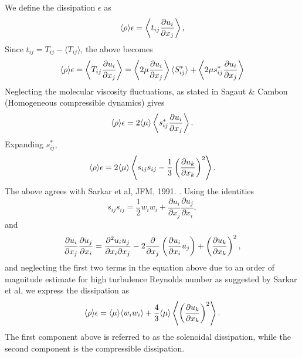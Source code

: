 \documentclass[oneside,a4paper,11pt]{report}
\begin{document}
We define the dissipation $\epsilon$ as
\begin{equation}
\langle \rho \rangle \epsilon = \left <  t_{ij} \frac{ \partial u_i }{\partial x_j } \right > ,
\end{equation}
Since $t_{ij} = T_{ij} - \langle T_{ij} \rangle$, the above becomes
\begin{equation}
    \langle \rho \rangle \epsilon = \left < T_{ij} \frac{\partial u_i}{\partial x_j} \right > = \left < 2 \mu \frac{\partial u_i}{\partial x_j} \right > \langle S^*_{ij} \rangle + \left < 2 \mu s^*_{ij} \frac{\partial u_i}{\partial x_j} \right >
\end{equation}
Neglecting the molecular viscosity fluctuations, as stated in Sagaut \& Cambon (Homogeneous compressible dynamics) gives
\begin{equation}
    \langle \rho \rangle \epsilon = 2 \langle \mu \rangle \left < s^*_{ij} \frac{\partial u_i}{\partial x_j} \right >.
\end{equation}
Expanding $s^*_{ij}$,
\begin{equation}
    \langle \rho \rangle \epsilon = 2 \langle \mu \rangle \left < s_{ij} s_{ij} - \frac{1}{3} \left ( \frac{ \partial u_k }{ \partial x_k } \right )^2 \right >.
\end{equation}
The above agrees with Sarkar et al, JFM, 1991. \cite{Sarkar1991}. Using the identities 
\begin{equation}
s_{ij} s_{ij} = \frac{1}{2} w_i w_i + \frac{ \partial u_i }{ \partial x_j } \frac{ \partial u_j }{ \partial x_i}, 
\end{equation}
and
\begin{equation}
\frac{ \partial u_i }{ \partial x_j } \frac{ \partial u_j }{ \partial x_i } = \frac{ \partial^2 u_i u_j }{ \partial x_i \partial x_j}  -2 \frac{ \partial }{ \partial x_j } \left ( \frac{ \partial u_i }{ \partial x_i } u_j \right ) + \left ( \frac{ \partial u_k }{ \partial x_k } \right )^2 ,
\end{equation}
and neglecting the first two terms in the equation above due to an order of magnitude estimate for high turbulence Reynolds number as suggested by Sarkar et al, we express the dissipation as
\begin{equation}
\langle \rho \rangle \epsilon = \langle \mu \rangle \langle w_i w_i \rangle + \frac{4}{3} \langle \mu \rangle \left < \left ( \frac{ \partial u_k }{ \partial x_k } \right )^2 \right >.
\end{equation}
The first component above is referred to as the solenoidal dissipation, while the second component is the compressible dissipation.
\end{document}
